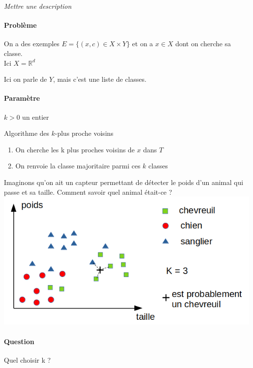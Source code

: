 
\textit{Mettre une description}

\paragraph{Problème} On a des exemples $E = \{(x, c) \in X\times Y\}$ et on a $x \in X$ dont on cherche sa classe.\\
Ici $X = \mathbb R^d$

\begin{com}
	Ici on parle de $Y$, mais c'est une liste de classes.
\end{com}

\paragraph{Paramètre} $k > 0$ un entier

\begin{algo} Algorithme des $k$-plus proche voisins
	\begin{enumerate}
		\item On cherche les k plus proches voisins de $x$ dans $T$
		\item On renvoie la classe majoritaire parmi ces $k$ classes
	\end{enumerate}
\end{algo}

\begin{example}
	Imaginons qu'on ait un capteur permettant de détecter le poids d'un animal qui passe et sa taille. Comment savoir quel animal était-ce ?\\ \centering
	\includegraphics[scale=0.4]{Developpements/k voisins/graphe.png}
\end{example}

\paragraph{Question} Quel choisir k ?

